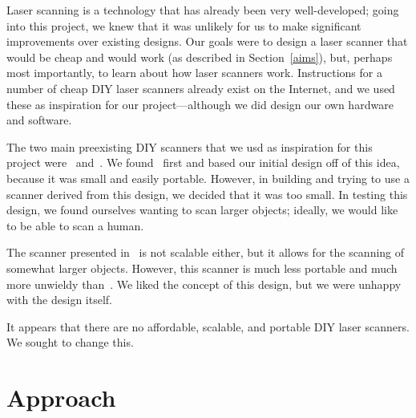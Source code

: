 \documentclass[12pt, letterpaper]{article}
\begin{document}
Laser scanning is a technology that has already been very well-developed; going into
this project, we knew that it was unlikely for us to make significant improvements
over existing designs. Our goals were to design a laser scanner that would be cheap
and would work (as described in Section~\ref{aims}), but, perhaps most importantly,
to learn about how laser scanners work. Instructions for a number of cheap DIY laser
scanners already exist on the Internet, and we used these as inspiration for our
project---although we did design our own hardware and software.

The two main preexisting DIY scanners that we usd as inspiration for this project
were~\cite{sardau} and~\cite{dentroman}. We found~\cite{sardau} first and based
our initial design off of this idea, because it was small and easily portable. However,
in building and trying to use a scanner derived from this design, we decided that it 
was too small. In testing this design, we found ourselves wanting to scan larger objects;
ideally, we would like to be able to scan a human.

The scanner presented in~\cite{dentroman} is not scalable either, but it allows for the
scanning of somewhat larger objects. However, this scanner is much less portable and much
more unwieldy than~\cite{sardau}. We liked the concept of this design, but we were unhappy
with the design itself.

It appears that there are no affordable, scalable, and portable DIY laser scanners.
We sought to change this.

\section{Approach}
\end{document}

